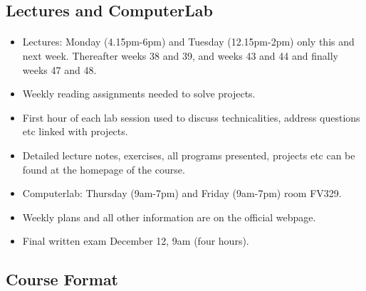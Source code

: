 \documentclass[%
oneside,                 %
final,                   %
10pt]{article}
\begin{document}
\noindent



\subsection*{Lectures and ComputerLab}


\paragraph{}
\begin{itemize}
  \item Lectures: Monday (4.15pm-6pm) and Tuesday (12.15pm-2pm) only this and next week. Thereafter weeks 38 and 39, and weeks 43 and 44 and finally weeks 47 and 48.

  \item Weekly reading assignments needed to solve projects.

  \item First hour of each lab session used to discuss technicalities, address questions etc linked with projects.

  \item Detailed lecture notes, exercises, all programs presented, projects etc can be found at the homepage of the course.

  \item Computerlab: Thursday (9am-7pm) and Friday (9am-7pm) room FV329.

  \item Weekly plans and all other information are on the official webpage.

  \item Final written exam December 12, 9am (four hours).
\end{itemize}

\noindent



\subsection*{Course Format}


\end{document}
